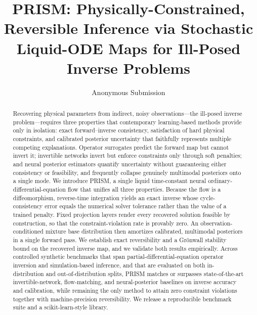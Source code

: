 \documentclass[letterpaper]{article} %
\title{PRISM: Physically-Constrained, Reversible Inference via Stochastic Liquid-ODE Maps for Ill-Posed Inverse Problems}
\author{
    Anonymous Submission
}
\begin{document}
\maketitle

\begin{abstract}
Recovering physical parameters from indirect, noisy observations---the ill-posed inverse problem---requires three properties that contemporary learning-based methods provide only in isolation: exact forward--inverse consistency, satisfaction of hard physical constraints, and calibrated posterior uncertainty that faithfully represents multiple competing explanations. Operator surrogates predict the forward map but cannot invert it; invertible networks invert but enforce constraints only through soft penalties; and neural posterior estimators quantify uncertainty without guaranteeing either consistency or feasibility, and frequently collapse genuinely multimodal posteriors onto a single mode. We introduce PRISM, a single liquid time-constant neural ordinary-differential-equation flow that unifies all three properties. Because the flow is a diffeomorphism, reverse-time integration yields an exact inverse whose cycle-consistency error equals the numerical solver tolerance rather than the value of a trained penalty. Fixed projection layers render every recovered solution feasible by construction, so that the constraint-violation rate is provably zero. An observation-conditioned mixture base distribution then amortizes calibrated, multimodal posteriors in a single forward pass. We establish exact reversibility and a Gr\"onwall stability bound on the recovered inverse map, and we validate both results empirically. Across controlled synthetic benchmarks that span partial-differential-equation operator inversion and simulation-based inference, and that are evaluated on both in-distribution and out-of-distribution splits, PRISM matches or surpasses state-of-the-art invertible-network, flow-matching, and neural-posterior baselines on inverse accuracy and calibration, while remaining the only method to attain zero constraint violations together with machine-precision reversibility. We release a reproducible benchmark suite and a scikit-learn-style library.
\end{abstract}

\end{document}
